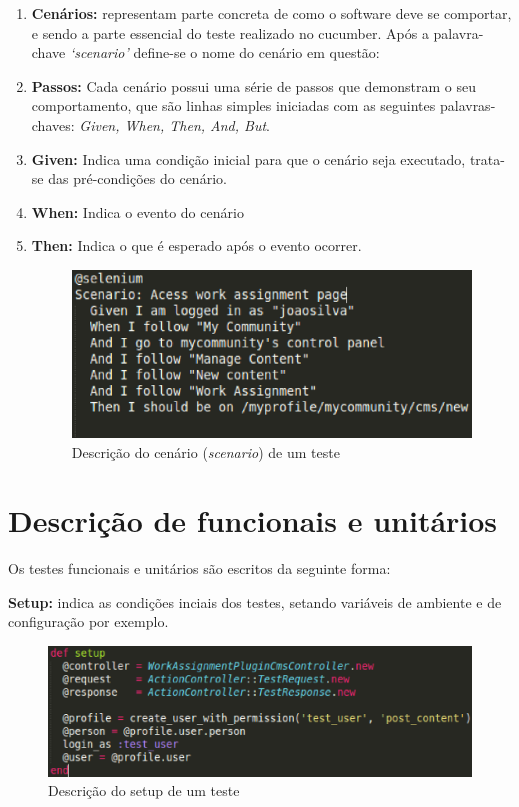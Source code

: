 \begin{enumerate}
\item \textbf{Cenários:} representam parte concreta de como o software deve se 
comportar, e sendo a parte essencial do teste realizado no 
cucumber. Após a palavra-chave \textit{‘scenario’} define-se o nome do cenário em questão:
\item \textbf{Passos:} Cada cenário possui uma série de passos que demonstram o seu 
comportamento, que são linhas simples iniciadas com as seguintes palavras-chaves: 
\textit{Given, When, Then, And, But}.
\item \textbf{Given:} Indica uma condição inicial para que o cenário seja executado, 
trata-se das pré-condições do cenário.
\item \textbf{When:} Indica o evento do cenário
\item \textbf{Then:} Indica o que é esperado após o evento ocorrer.

\begin{figure}[!h]
    \centering
    \includegraphics[keepaspectratio=true,scale=0.50]
      {figuras/noosfero_scenario.eps}
    \caption{Descrição do cenário (\textit{scenario}) de um teste}
    \label{nosfero_scenario}
\end{figure}

\end{enumerate}

\section {Descrição de funcionais e unitários}

Os testes funcionais e unitários são escritos da seguinte forma:

\textbf{Setup:} indica as condições inciais dos testes, setando variáveis de ambiente e de configuração por exemplo.

\begin{figure}[!h]
    \centering
    \includegraphics[keepaspectratio=true,scale=0.5]
      {figuras/teste_setup.eps}
    \caption{Descrição do setup de um teste}
    \label{nosfero_setup}
\end{figure}

